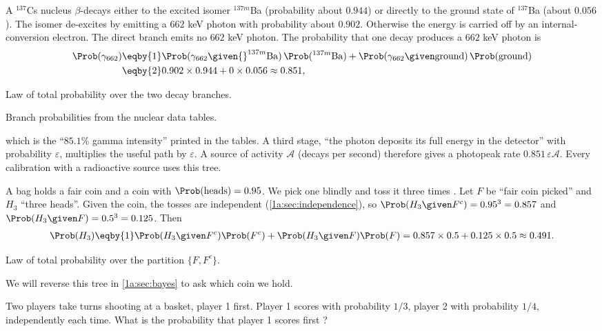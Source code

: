 \label{1a:ex:cs137}
A $^{137}$Cs nucleus $\beta$-decays either to the excited isomer $^{137m}$Ba
(probability about $0.944$) or directly to the ground state of $^{137}$Ba (about
$0.056$). The isomer de-excites by emitting a $662$ keV photon with probability
about $0.902$. Otherwise the energy is carried off by an internal-conversion
electron. The direct branch emits no $662$ keV photon. The probability that one
decay produces a $662$ keV photon is
\begin{align*}
\Prob(\gamma_{662})
&\eqby{1}\Prob(\gamma_{662}\given{}^{137m}\mathrm{Ba})\,\Prob({}^{137m}\mathrm{Ba})
       +\Prob(\gamma_{662}\given\text{ground})\,\Prob(\text{ground})\\
&\eqby{2}0.902\times0.944+0\times0.056\approx0.851 ,
\end{align*}
\begin{explain}
  \item Law of total probability over the two decay branches.
  \item Branch probabilities from the nuclear data tables.
\end{explain}
which is the ``$85.1\%$ gamma intensity'' printed in the tables. A third stage,
``the photon deposits its full energy in the detector'' with probability
$\varepsilon$, multiplies the useful path by $\varepsilon$. A source of activity
$\mathcal A$ (decays per second) therefore gives a photopeak rate
$0.851\,\varepsilon\mathcal A$. Every calibration with a radioactive source uses
this tree.

\label{1a:ex:bag-total}
A bag holds a fair coin and a coin with $\Prob(\text{heads})=0.95$. We pick one
blindly and toss it three times . Let $F$ be ``fair
coin picked'' and $H_3$ ``three heads''. Given the coin, the tosses are
independent (\cref{1a:sec:independence}), so $\Prob(H_3\given F^c)=0.95^3=0.857$ and
$\Prob(H_3\given F)=0.5^3=0.125$. Then
\begin{align*}
\Prob(H_3)\eqby{1}\Prob(H_3\given F^c)\Prob(F^c)+\Prob(H_3\given F)\Prob(F)
=0.857\times0.5+0.125\times0.5\approx0.491 .
\end{align*}
\begin{explain}
  \item Law of total probability over the partition $\{F,F^c\}$.
\end{explain}
We will reverse this tree in \cref{1a:sec:bayes} to ask which coin we hold.

\label{1a:ex:basketball}
Two players take turns shooting at a basket, player 1 first. Player 1 scores
with probability $1/3$, player 2 with probability $1/4$, independently each
time. What is the probability that player 1 scores first
?

